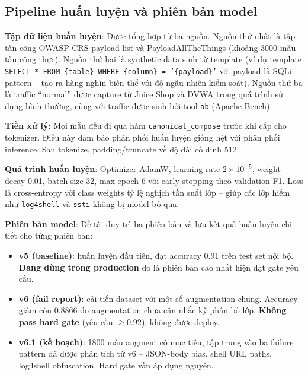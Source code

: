 \documentclass[../DoAn.tex]{subfiles}
\begin{document}
\subsection{Pipeline huấn luyện và phiên bản model}
\label{subsection:4.3.4}

\textbf{Tập dữ liệu huấn luyện}: Được tổng hợp từ ba nguồn. Nguồn thứ nhất
là tập tấn công OWASP CRS payload list và PayloadAllTheThings (khoảng 3000
mẫu tấn công thực). Nguồn thứ hai là synthetic data sinh từ template (ví
dụ template \texttt{SELECT * FROM \{table\} WHERE \{column\} = '\{payload\}'}
với payload là SQLi pattern -- tạo ra hàng nghìn biến thể với độ ngẫu
nhiên kiểm soát). Nguồn thứ ba là traffic ``normal'' được capture từ Juice
Shop và DVWA trong quá trình sử dụng bình thường, cùng với traffic được
sinh bởi tool \texttt{ab} (Apache Bench).

\textbf{Tiền xử lý}: Mọi mẫu đều đi qua hàm \texttt{canonical\_compose}
trước khi cấp cho tokenizer. Điều này đảm bảo phân phối huấn luyện giống
hệt với phân phối inference. Sau tokenize, padding/truncate về độ dài cố
định 512.

\textbf{Quá trình huấn luyện}: Optimizer AdamW, learning rate
\(2 \times 10^{-5}\), weight decay 0.01, batch size 32, max epoch 6 với
early stopping theo validation F1. Loss là cross-entropy với class weights
tỷ lệ nghịch tần suất lớp -- giúp các lớp hiếm như \texttt{log4shell} và
\texttt{ssti} không bị model bỏ qua.

\textbf{Phiên bản model}: Đề tài duy trì ba phiên bản và lưu kết quả huấn
luyện chi tiết cho từng phiên bản:

\begin{itemize}[leftmargin=*]
    \item \textbf{v5 (baseline)}: huấn luyện đầu tiên, đạt accuracy 0.91 trên
    test set nội bộ. \textbf{Đang dùng trong production} do là phiên bản
    cao nhất hiện đạt gate yêu cầu.

    \item \textbf{v6 (fail report)}: cải tiến dataset với một số augmentation
    chung. Accuracy giảm còn 0.8866 do augmentation chưa cân nhắc kỹ phân
    bố lớp. \textbf{Không pass hard gate} (yêu cầu \(\ge 0.92\)), không
    được deploy.

    \item \textbf{v6.1 (kế hoạch)}: 1800 mẫu augment có mục tiêu, tập trung
    vào ba failure pattern đã được phân tích từ v6 -- JSON-body bias, shell
    URL paths, log4shell obfuscation. Hard gate vẫn áp dụng nguyên.
\end{itemize}
\end{document}
